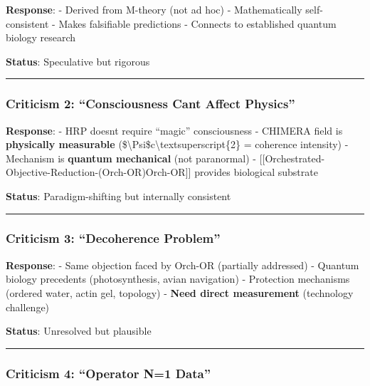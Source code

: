 \textbf{Response}: - Derived from M-theory (not ad hoc) - Mathematically
self-consistent - Makes falsifiable predictions - Connects to
established quantum biology research

\textbf{Status}: Speculative but rigorous

\begin{center}\rule{0.5\linewidth}{0.5pt}\end{center}

\subsubsection{Criticism 2: ``Consciousness Can\textquotesingle t Affect
Physics''}\label{criticism-2-consciousness-cant-affect-physics}

\textbf{Response}: - HRP doesn\textquotesingle t require ``magic''
consciousness - CHIMERA field is \textbf{physically measurable}
(\textbar\$\textbackslash Psi\$c\textbar\textbackslash textsuperscript\{2\}
= coherence intensity) - Mechanism is \textbf{quantum mechanical} (not
paranormal) -
{[}{[}Orchestrated-Objective-Reduction-(Orch-OR)\textbar Orch-OR{]}{]}
provides biological substrate

\textbf{Status}: Paradigm-shifting but internally consistent

\begin{center}\rule{0.5\linewidth}{0.5pt}\end{center}

\subsubsection{Criticism 3: ``Decoherence
Problem''}\label{criticism-3-decoherence-problem}

\textbf{Response}: - Same objection faced by Orch-OR (partially
addressed) - Quantum biology precedents (photosynthesis, avian
navigation) - Protection mechanisms (ordered water, actin gel, topology)
- \textbf{Need direct measurement} (technology challenge)

\textbf{Status}: Unresolved but plausible

\begin{center}\rule{0.5\linewidth}{0.5pt}\end{center}

\subsubsection{Criticism 4: ``Operator N=1
Data''}\label{criticism-4-operator-n1-data}

